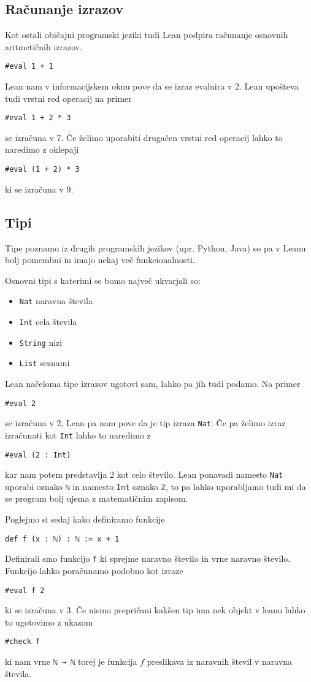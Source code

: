 \documentclass[mat1]{fmfdelo}
\begin{document}
\subsection{Računanje izrazov}
Kot ostali običajni programski jeziki tudi Lean podpira računanje osnovnih aritmetičnih izrazov.
\begin{lstlisting}
#eval 1 + 1
\end{lstlisting}
Lean nam v informacijskem oknu pove da se izraz evaluira v 2. Lean upošteva tudi vrstni red operacij na primer
\begin{lstlisting}
#eval 1 + 2 * 3
\end{lstlisting}
se izračuna v 7. Če želimo uporabiti drugačen vrstni red operacij lahko to naredimo z oklepaji
\begin{lstlisting}
#eval (1 + 2) * 3
\end{lstlisting}
ki se izračuna v 9.
\subsection{Tipi}
Tipe poznamo iz drugih programskih jezikov (npr. Python, Java) so pa v Leanu bolj pomembni in imajo nekaj več funkcionalnosti.

Osnovni tipi s katerimi se bomo največ ukvarjali so:
\begin{itemize}
    \item \lstinline{Nat} naravna števila
    \item \lstinline{Int} cela števila
    \item \lstinline{String} nizi
    \item \lstinline{List} seznami
\end{itemize}
Lean načeloma tipe izrazov ugotovi sam, lahko pa jih tudi podamo. Na primer
\begin{lstlisting}
#eval 2
\end{lstlisting}
se izračuna v 2, Lean pa nam pove da je tip izraza \lstinline{Nat}. Če pa želimo izraz izračunati kot \lstinline{Int} lahko to naredimo z
\begin{lstlisting}
#eval (2 : Int)
\end{lstlisting}
kar nam potem predstavlja 2 kot celo število. Lean ponavadi namesto
\lstinline{Nat} uporabi oznako \lstinline{ℕ} in namesto \lstinline{Int} oznako \lstinline{ℤ}, to pa lahko uporabljamo tudi mi
da se program bolj ujema z matematičnim zapisom. 

Poglejmo si sedaj kako definiramo funkcije
\begin{lstlisting}
def f (x : ℕ) : ℕ := x + 1
\end{lstlisting}
Definirali smo funkcijo \lstinline{f} ki sprejme naravno število in vrne naravno število. Funkcijo lahko poračunamo podobno kot izraze
\begin{lstlisting}
#eval f 2
\end{lstlisting}
ki se izračuna v 3. Če nismo prepričani kakšen tip ima nek objekt v leanu lahko to ugotovimo z ukazom
\begin{lstlisting}
#check f
\end{lstlisting}
ki nam vrne \lstinline{ℕ → ℕ} torej je funkcija $f$ preslikava iz naravnih števil v naravna števila.
\end{document}
